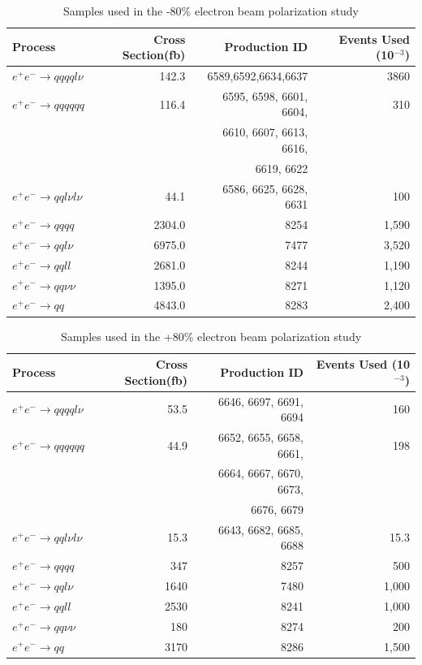 \begin{table}
  \centering
  \begin{tabular}{l | r | r |r}
    \toprule
    Process     & Cross Section(fb) & Production ID & Events Used (10$^{-3}$) \\
    \midrule
    $e^+e^-\rightarrow qqqql\nu$ & 142.3 & 6589,6592,6634,6637 & 3860 \\
    \midrule
    $e^+e^-\rightarrow qqqqqq$ & 116.4 & 6595, 6598, 6601, 6604,  & 310 \\
     &  & 6610, 6607, 6613, 6616,  &  \\
     &  &  6619, 6622  &  \\
    \midrule
    $e^+e^-\rightarrow qql\nu l\nu$ & 44.1 & 6586, 6625, 6628, 6631 & 100 \\
    \midrule
    $e^+e^-\rightarrow qqqq$ & 2304.0 & 8254 & 1,590 \\
    \midrule
    $e^+e^-\rightarrow qql\nu$ & 6975.0 & 7477 & 3,520 \\
    \midrule
    $e^+e^-\rightarrow qqll$ & 2681.0 & 8244 & 1,190 \\
    \midrule
    $e^+e^-\rightarrow qq\nu\nu$ & 1395.0 & 8271 & 1,120 \\
    \midrule
    $e^+e^-\rightarrow qq$ & 4843.0 & 8283 & 2,400 \\
    \bottomrule
  \end{tabular}
  \caption{Samples used in the -80\% electron beam polarization study}
  \label{table:topsamplesnegpol}
\end{table}

\begin{table}
  \centering
  \begin{tabular}{l | r | r |r}
    \toprule
    Process     & Cross Section(fb) & Production ID & Events Used (10$^{-3}$) \\
    \midrule
    $e^+e^-\rightarrow qqqql\nu$ & 53.5 & 6646, 6697, 6691, 6694 & 160 \\
    \midrule
    $e^+e^-\rightarrow qqqqqq$ & 44.9 & 6652, 6655, 6658, 6661, & 198 \\
     &  & 6664, 6667, 6670, 6673, &  \\
     &  & 6676, 6679 &  \\
    \midrule
    $e^+e^-\rightarrow qql\nu l\nu$ & 15.3  & 6643, 6682, 6685, 6688 & 15.3 \\
    \midrule
    $e^+e^-\rightarrow qqqq$ & 347 & 8257 & 500 \\
    \midrule
    $e^+e^-\rightarrow qql\nu$ & 1640 & 7480 & 1,000 \\
    \midrule
    $e^+e^-\rightarrow qqll$ & 2530 & 8241 & 1,000 \\
    \midrule
    $e^+e^-\rightarrow qq\nu\nu$ & 180 & 8274 & 200 \\
    \midrule
    $e^+e^-\rightarrow qq$ & 3170 & 8286 & 1,500 \\
    \bottomrule
  \end{tabular}
  \caption{Samples used in the +80\% electron beam polarization study}
  \label{table:topsamplespospol}
\end{table}


